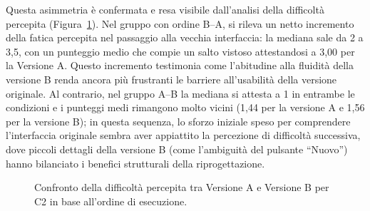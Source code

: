 Questa asimmetria è confermata e resa visibile dall'analisi della difficoltà percepita (Figura~\ref{fig:6-c2-2}). Nel gruppo con ordine B--A, si rileva un netto incremento della fatica percepita nel passaggio alla vecchia interfaccia: la mediana sale da 2 a 3,5, con un punteggio medio che compie un salto vistoso attestandosi a 3,00 per la Versione A. Questo incremento testimonia come l'abitudine alla fluidità della versione B renda ancora più frustranti le barriere all'usabilità della versione originale. Al contrario, nel gruppo A--B la mediana si attesta a 1 in entrambe le condizioni e i punteggi medi rimangono molto vicini (1,44 per la versione A e 1,56 per la versione B); in questa sequenza, lo sforzo iniziale speso per comprendere l'interfaccia originale sembra aver appiattito la percezione di difficoltà successiva, dove piccoli dettagli della versione B (come l'ambiguità del pulsante ``Nuovo'') hanno bilanciato i benefici strutturali della riprogettazione.

\begin{figure}[H]
	\centering
	\caption{Confronto della difficoltà percepita tra Versione A e Versione B per C2 in base all'ordine di esecuzione.}
	\label{fig:6-c2-2}
\end{figure}
